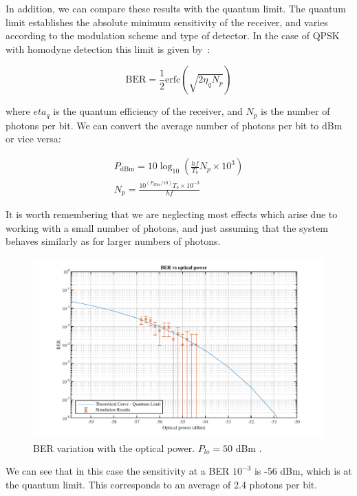 In addition, we can compare these results with the quantum limit. The quantum 
limit establishes the absolute minimum sensitivity of the receiver, and varies 
according to the modulation scheme and type of detector. In the case of QPSK 
with homodyne detection this limit is given by~\cite{senior09, agrawal12}:

\begin{equation}\label{eq:quantumLimit_homodyne}
\text{BER} = \frac{1}{2} \text{erfc}\left( \sqrt{2 \eta_q N_p}\right)
\end{equation}

\noindent where $eta_q$ is the quantum efficiency of the receiver, and $N_p$ is 
the number of photons per bit. We can convert the average number of photons per 
bit to dBm or vice versa:

\begin{align}
	P_{\text{dBm}} = 10 \log_{10}\left(\frac{h f}{T_b} N_p \times 10^3\right) \\
	N_p = \frac{10^{(P_{\text{dBm}}/10)} T_b \times 10^{-3}}{hf}
\end{align}

It is worth remembering that we are neglecting most effects which arise due to 
working with a small number of photons, and just assuming that the system 
behaves similarly as for larger numbers of photons.

	\begin{figure}[h]
	\centering
	\includegraphics[width=1\textwidth]
	{sdf/m_qam_system/figures/simulations/05_loShot/berCurve_loShot2.pdf}
	\caption{BER variation with the optical power. $P_{lo} = 50$ dBm 
	.}\label{fig:sim_loShot_quantumLimit}
\end{figure}

We can see that in this case the sensitivity at a BER $10^{-3}$ is -56 dBm, 
which is at the quantum limit. This corresponds to an average of 2.4 photons 
per bit.

